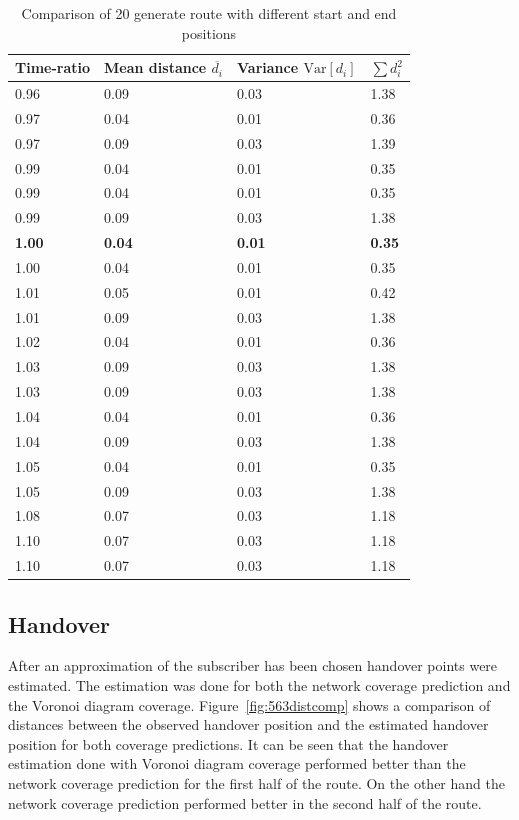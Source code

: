\begin{table}
\centering
\begin{tabular}{l|l|l|l}
Time-ratio & Mean distance $\overline{d_i}$ & Variance $\mathrm{Var}[d_i]$& $\sum {d}_{i}^{2}$ \\
\hline
0.96 & 0.09 & 0.03 & 1.38 \\
0.97 & 0.04 & 0.01 & 0.36 \\
0.97 & 0.09 & 0.03 & 1.39 \\
0.99 & 0.04 & 0.01 & 0.35 \\
0.99 & 0.04 & 0.01 & 0.35 \\
0.99 & 0.09 & 0.03 & 1.38 \\
\textbf{1.00} & \textbf{0.04 }& \textbf{0.01} & \textbf{0.35} \\
1.00 & 0.04 & 0.01 & 0.35 \\
1.01 & 0.05 & 0.01 & 0.42 \\
1.01 & 0.09 & 0.03 & 1.38 \\
1.02 & 0.04 & 0.01 & 0.36 \\
1.03 & 0.09 & 0.03 & 1.38 \\
1.03 & 0.09 & 0.03 & 1.38 \\
1.04 & 0.04 & 0.01 & 0.36 \\
1.04 & 0.09 & 0.03 & 1.38 \\
1.05 & 0.04 & 0.01 & 0.35 \\
1.05 & 0.09 & 0.03 & 1.38 \\
1.08 & 0.07 & 0.03 & 1.18 \\
1.10 & 0.07 & 0.03 & 1.18 \\
1.10 & 0.07 & 0.03 & 1.18
\end{tabular}
\caption{Comparison of 20 generate route with different start and end positions}
\label{tab:563route}
\end{table}
\subsection{Handover}
After an approximation of the subscriber has been chosen handover points were estimated. The estimation was done for both the network coverage prediction and the Voronoi diagram coverage. Figure~\ref{fig:563distcomp} shows a comparison of distances between the observed handover position and the estimated handover position for both coverage predictions. It can be seen that the handover estimation done with Voronoi diagram coverage performed better than the network coverage prediction for the first half of the route. On the other hand the network coverage prediction performed better in the second half of the route. 
